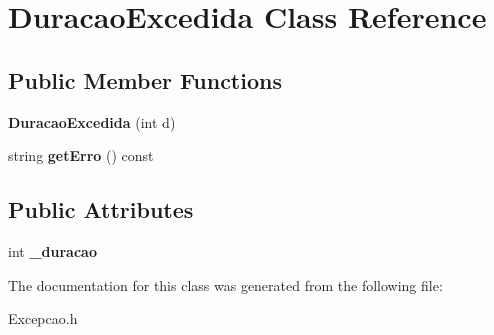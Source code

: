 \hypertarget{class_duracao_excedida}{\section{Duracao\-Excedida Class Reference}
\label{class_duracao_excedida}
}
\subsection*{Public Member Functions}
\begin{DoxyCompactItemize}
\item 
\hypertarget{class_duracao_excedida_a99e2ea6501cd6c8191b36395c2216055}{{\bfseries Duracao\-Excedida} (int d)}\label{class_duracao_excedida_a99e2ea6501cd6c8191b36395c2216055}

\item 
\hypertarget{class_duracao_excedida_af83836450fa7d721d277b80e6b145ff4}{string {\bfseries get\-Erro} () const }\label{class_duracao_excedida_af83836450fa7d721d277b80e6b145ff4}

\end{DoxyCompactItemize}
\subsection*{Public Attributes}
\begin{DoxyCompactItemize}
\item 
\hypertarget{class_duracao_excedida_a9a6e5e0de552c9c6d10e8b387e7db03a}{int {\bfseries \-\_\-duracao}}\label{class_duracao_excedida_a9a6e5e0de552c9c6d10e8b387e7db03a}

\end{DoxyCompactItemize}


The documentation for this class was generated from the following file\-:\begin{DoxyCompactItemize}
\item 
Excepcao.\-h\end{DoxyCompactItemize}
